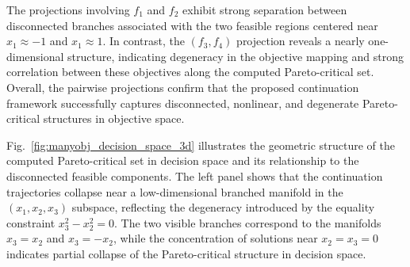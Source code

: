 \documentclass[11pt,pdflatex,sn-mathphys-ay]{sn-jnl}%
\theoremstyle{definition}
\theoremstyle{thmstyleone}%
\theoremstyle{thmstyletwo}%
\theoremstyle{thmstylethree}%
\begin{document}
	The projections involving \(f_1\) and \(f_2\) exhibit strong separation between disconnected branches associated with the two feasible regions centered near \(x_1\approx -1\) and \(x_1\approx 1\). In contrast, the \((f_3,f_4)\) projection reveals a nearly one-dimensional structure, indicating degeneracy in the objective mapping and strong correlation between these objectives along the computed Pareto-critical set. Overall, the pairwise projections confirm that the proposed continuation framework successfully captures disconnected, nonlinear, and degenerate Pareto-critical structures in objective space.
	
	Fig.~\ref{fig:manyobj_decision_space_3d} illustrates the geometric structure of the computed Pareto-critical set in decision space and its relationship to the disconnected feasible components. The left panel shows that the continuation trajectories collapse near a low-dimensional branched manifold in the \((x_1,x_2,x_3)\) subspace, reflecting the degeneracy introduced by the equality constraint \(x_3^2-x_2^2=0\). The two visible branches correspond to the manifolds \(x_3=x_2\) and \(x_3=-x_2\), while the concentration of solutions near \(x_2=x_3=0\) indicates partial collapse of the Pareto-critical structure in decision space.
	
\end{document}
